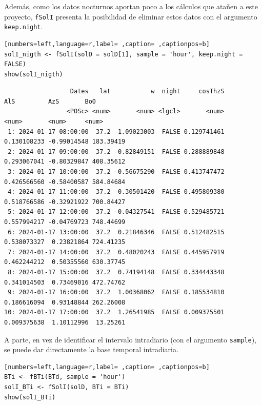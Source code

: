 Además, como los datos nocturnos aportan poco a los cálculos que atañen a este proyecto, \texttt{fSolI} presenta la posibilidad de eliminar estos datos con el argumento \texttt{keep.night}.
\begin{lstlisting}[numbers=left,language=r,label= ,caption= ,captionpos=b]
solI_nigth <- fSolI(solD = solD[1], sample = 'hour', keep.night = FALSE)
show(solI_nigth)
\end{lstlisting}

\begin{verbatim}
                  Dates   lat           w  night     cosThzS         AlS         AzS       Bo0
                 <POSc> <num>       <num> <lgcl>       <num>       <num>       <num>     <num>
 1: 2024-01-17 08:00:00  37.2 -1.09023003  FALSE 0.129741461 0.130108233 -0.99014548 183.39419
 2: 2024-01-17 09:00:00  37.2 -0.82849151  FALSE 0.288889848 0.293067041 -0.80329847 408.35612
 3: 2024-01-17 10:00:00  37.2 -0.56675290  FALSE 0.413747472 0.426566560 -0.58400587 584.84684
 4: 2024-01-17 11:00:00  37.2 -0.30501420  FALSE 0.495809380 0.518766586 -0.32921922 700.84427
 5: 2024-01-17 12:00:00  37.2 -0.04327541  FALSE 0.529485721 0.557994217 -0.04769723 748.44699
 6: 2024-01-17 13:00:00  37.2  0.21846346  FALSE 0.512482515 0.538073327  0.23821864 724.41235
 7: 2024-01-17 14:00:00  37.2  0.48020243  FALSE 0.445957919 0.462244212  0.50355560 630.37745
 8: 2024-01-17 15:00:00  37.2  0.74194148  FALSE 0.334443348 0.341014503  0.73469016 472.74762
 9: 2024-01-17 16:00:00  37.2  1.00368062  FALSE 0.185534810 0.186616094  0.93148844 262.26008
10: 2024-01-17 17:00:00  37.2  1.26541985  FALSE 0.009375501 0.009375638  1.10112996  13.25261
\end{verbatim}

A parte, en vez de identificar el intervalo intradiario (con el argumento \texttt{sample}), se puede dar directamente la base temporal intradiaria.
\begin{lstlisting}[numbers=left,language=r,label= ,caption= ,captionpos=b]
BTi <- fBTi(BTd, sample = 'hour')
solI_BTi <- fSolI(solD, BTi = BTi)
show(solI_BTi)
\end{lstlisting}

